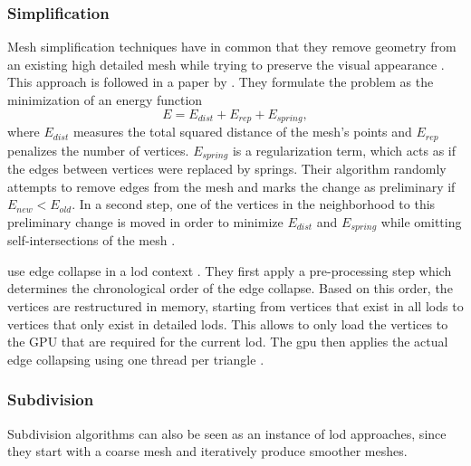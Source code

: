 \subsubsection*{Simplification}
Mesh simplification techniques have in common that they remove geometry from an existing high detailed mesh while trying to preserve the visual appearance \cite{realtime}.
This approach is followed in a paper by \citeauthor{hoppe_simplification} \cite{hoppe_simplification}.
They formulate the problem as the minimization of an energy function 
\begin{equation*}
    E = E_{dist} + E_{rep} + E_{spring},
\end{equation*} where $E_{dist}$ measures the total squared distance of the mesh's points and $E_{rep}$ penalizes the number of vertices.
$E_{spring}$ is a regularization term, which acts as if the edges between vertices were replaced by springs.
Their algorithm randomly attempts to remove edges from the mesh and marks the change as preliminary if $E_{new} < E_{old}$.
In a second step, one of the vertices in the neighborhood to this preliminary change is moved in order to minimize $E_{dist}$ and $E_{spring}$ while omitting self-intersections of the mesh \cite{hoppe_simplification}.

\citeauthor{peng_simplification} use edge collapse in a \ac{lod} context \cite{peng_simplification}.
They first apply a pre-processing step which determines the chronological order of the edge collapse.
Based on this order, the vertices are restructured in memory, starting from vertices that exist in all \acp{lod} to vertices that only exist in detailed \acp{lod}.
This allows to only load the vertices to the GPU that are required for the current \ac{lod}.
The \ac{gpu} then applies the actual edge collapsing using one thread per triangle \cite{peng_simplification}.

\subsubsection*{Subdivision}
Subdivision algorithms can also be seen as an instance of \ac{lod} approaches, since they start with a coarse mesh and iteratively produce smoother meshes.

